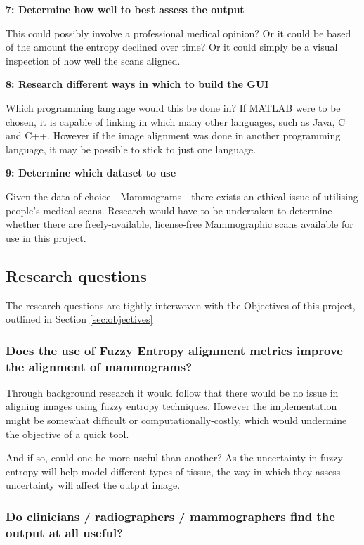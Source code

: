 \noindent \textbf{7: Determine how well to best assess the output}

This could possibly involve a professional medical opinion? Or it could be based of the amount the entropy declined over time? Or it could simply be a visual inspection of how well the scans aligned.

\noindent \textbf{8: Research different ways in which to build the \acrshort{GUI}}

Which programming language would this be done in? If MATLAB were to be chosen, it is capable of linking in which many other languages, such as Java, C and C++. However if the image alignment was done in another programming language, it may be possible to stick to just one language.

\noindent \textbf{9: Determine which dataset to use}

Given the data of choice - Mammograms - there exists an ethical issue of utilising people's medical scans. Research would have to be undertaken to determine whether there are freely-available, license-free Mammographic scans available for use in this project.

\subsection{Research questions}
\label{ssec:research-qs}

The research questions are tightly interwoven with the Objectives of this project, outlined in Section \ref{sec:objectives}

\subsubsection{Does the use of Fuzzy Entropy alignment metrics improve the alignment of mammograms?}

Through background research it would follow that there would be no issue in aligning images using fuzzy entropy techniques. However the implementation might be somewhat difficult or computationally-costly, which would undermine the objective of a quick tool.

And if so, could one be more useful than another? As the uncertainty in fuzzy entropy will help model different types of tissue, the way in which they assess uncertainty will affect the output image.

\subsubsection{Do clinicians / radiographers / mammographers find the output at all useful?}

